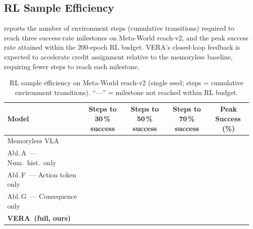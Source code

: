 \documentclass{article}
\newcommand{\modelname}{\textsc{VERA}\xspace}
\begin{document}
\subsection{RL Sample Efficiency}
\label{sec:sample_eff}

 reports the number of environment steps (cumulative
transitions) required to reach three success-rate milestones on Meta-World reach-v2,
and the peak success rate attained within the 200-epoch RL budget.
\modelname's closed-loop feedback is expected to accelerate credit assignment
relative to the memoryless baseline, requiring fewer steps to reach each milestone.

\begin{table}[h]
\centering
\caption{RL sample efficiency on Meta-World reach-v2 (single seed; steps = cumulative
         environment transitions). ``---'' = milestone not reached within RL budget.}
\label{tab:sample_efficiency}
\small
\setlength{\tabcolsep}{6pt}
\begin{tabular}{lcccc}
\toprule
\textbf{Model}
  & \makecell{Steps to\\30\,\% success}
  & \makecell{Steps to\\50\,\% success}
  & \makecell{Steps to\\70\,\% success}
  & \makecell{Peak\\Success\,(\%)} \\
\midrule
Memoryless VLA
  & \text{---} & \text{---} & \text{---} & \text{---} \\
Abl.\,A\ — Num.\ hist.\ only
  & \text{---} & \text{---} & \text{---} & \text{---} \\
Abl.\,F\ — Action token only
  & \text{---} & \text{---} & \text{---} & \text{---} \\
Abl.\,G\ — Consequence only
  & \text{---} & \text{---} & \text{---} & \text{---} \\
\textbf{\modelname\ (full, ours)}
  & \textbf{\text{---}} & \textbf{\text{---}} & \textbf{\text{---}} & \textbf{\text{---}} \\
\bottomrule
\end{tabular}
\vspace{2pt}\\
\footnotesize
\end{table}
\end{document}
